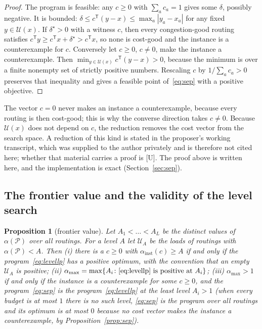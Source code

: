 \documentclass[11pt]{article}
\newtheorem{proposition}{Proposition}
\theoremstyle{remark}
\begin{document}
\begin{proof}
The program is feasible: any $c\ge0$ with $\sum_ac_a=1$ gives some $\delta$, possibly negative. It is bounded: $\delta\le c^{\mathsf T}(y-x)\le\max_a|y_a-x_a|$ for any fixed $y\in\mathcal U(x)$.
If $\delta^\star>0$ with a witness $c$, then every congestion-good routing satisfies $c^{\mathsf T}y\ge c^{\mathsf T}x+\delta^\star>c^{\mathsf T}x$, so none is cost-good and the instance is a counterexample for $c$.
Conversely let $c\ge0$, $c\ne0$, make the instance a counterexample. Then $\min_{y\in\mathcal U(x)}c^{\mathsf T}(y-x)>0$, because the minimum is over a finite nonempty set of strictly positive numbers. Rescaling $c$ by
$1/\sum_ac_a>0$ preserves that inequality and gives a feasible point of~\eqref{eq:sep} with a positive objective.
\end{proof}

The vector $c=0$ never makes an instance a counterexample, because every routing is then cost-good; this is why the converse direction takes $c\ne0$. Because $\mathcal U(x)$ does not depend on $c$, the reduction removes the cost vector from the search space. A reduction of this kind is stated in the proposer's working transcript, which was supplied to the author privately and is therefore not cited here; whether that material carries a proof is [U]. The proof above is
written here, and the implementation is exact (Section~\ref{sec:sep}).

\subsection{The frontier value and the validity of the level search}
\label{sec:theory-frontier}

\begin{proposition}[frontier value]
\label{prop:frontier}
Let $A_1<\dots<A_L$ be the distinct values of $\alpha(\mathcal P)$ over all routings. For a level $A$ let $\mathcal U_A$ be the loads of routings with $\alpha(\mathcal P)<A$. Then
(i) there is a $c\ge0$ with $\alpha_{\mathrm{inst}}(c)\ge A$ if and only if the program~\eqref{eq:levellp} has a positive optimum, with the convention that an empty $\mathcal U_A$ is positive;
(ii) $\alpha_{\max}=\max\{A_i\colon\eqref{eq:levellp}\text{ is positive at }A_i\}$;
(iii) $\alpha_{\max}>1$ if and only if the instance is a counterexample for some $c\ge0$, and the program~\eqref{eq:sep} is the program~\eqref{eq:levellp} at the least level $A_i>1$ (when every budget is at most $1$ there is no such level, \eqref{eq:sep} is the program over all routings and its optimum is at most $0$ because no cost vector makes the instance a counterexample, by Proposition~\ref{prop:sep}).
\end{proposition}
\end{document}
